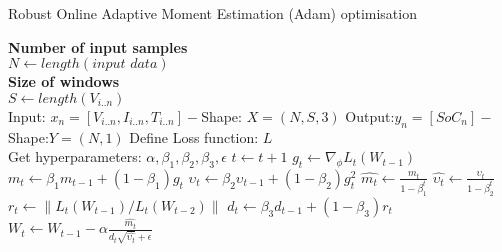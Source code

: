 \begin{algorithm}
  \caption{Robust Online Adaptive Moment Estimation (Adam) optimisation}
  \begin{algorithmic}[1]
    \STATE \textbf{Number of input samples} \\ $N\gets length(\textit{input data})$\\
    \STATE \textbf{Size of windows} \\ $S\gets length(V_{i..n})$\\
    \STATE Input: $x_n = [V_{i..n}, I_{i..n}, T_{i..n}] - $Shape: $X = (N, S, 3)$
    \STATE Output:$y_n = [SoC_{n}] - $Shape:$Y = (N, 1)$
    \STATE Define Loss function: $L$ \\
           Get hyperparameters: $\alpha, \beta_1, \beta_2, \beta_3, \epsilon$
    \STATE $t \gets t+1$
    \STATE $g_t \gets \nabla_\phi L_t (W_{t-1})$ 
    \STATE $m_t \gets \beta_1 m_{t-1}+(1-\beta_1) g_t $ 
    \STATE $\upsilon_t \gets \beta_2 \upsilon_{t-1}+ \left(1-\beta_2 \right)g^2_t $ 
    \STATE $\hat{m_t} \gets \frac{m_t}{1-\beta^t_1}$ 
    \STATE $\hat{\upsilon_t} \gets \frac{\upsilon_t}{1-\beta^t_2} $ 
    \STATE $r_t \gets \parallel L_t\left(W_{t-1}\right)/L_t\left(W_{t-2}\right) \parallel $ 
    \STATE $d_t \gets \beta_3 d_{t-1}+\left(1-\beta_3\right)r_t $ 
    \STATE $W_t \gets W_{t-1}- \alpha \frac{\hat{m_t}}{d_t\sqrt{\hat{\upsilon_t}}+\epsilon} $ 
    \ENDWHILE
  \end{algorithmic}
  \label{alg:RoAdam}
\end{algorithm}
